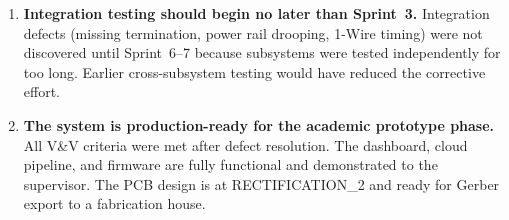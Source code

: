 \begin{enumerate}
    \item \textbf{Integration testing should begin no later than Sprint~3.} Integration defects (missing termination, power rail drooping, 1-Wire timing) were not discovered until Sprint~6--7 because subsystems were tested independently for too long. Earlier cross-subsystem testing would have reduced the corrective effort.

    \item \textbf{The system is production-ready for the academic prototype phase.} All V\&V criteria were met after defect resolution. The dashboard, cloud pipeline, and firmware are fully functional and demonstrated to the supervisor. The PCB design is at RECTIFICATION\_2 and ready for Gerber export to a fabrication house.
\end{enumerate}
